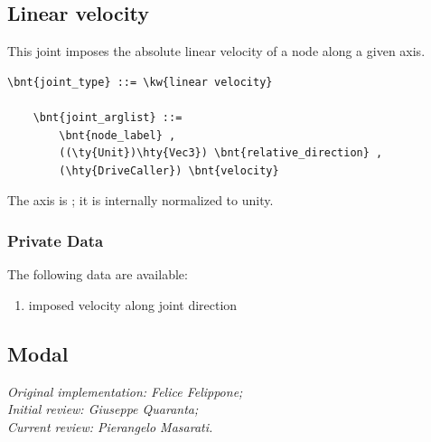 \subsection{Linear velocity}
This joint imposes the absolute linear velocity of a node
along a given axis.
\begin{Verbatim}[commandchars=\\\{\}]
    \bnt{joint_type} ::= \kw{linear velocity}

    \bnt{joint_arglist} ::=
        \bnt{node_label} ,
        ((\ty{Unit})\hty{Vec3}) \bnt{relative_direction} , 
        (\hty{DriveCaller}) \bnt{velocity}
\end{Verbatim}
The axis is ; it is internally normalized to unity.

\subsubsection{Private Data}
The following data are available:
\begin{enumerate}
\item {} imposed velocity along joint direction
\end{enumerate}



\subsection{Modal}\label{sec:EL:STRUCT:JOINT:MODAL}
\emph{
Original implementation: Felice Felippone; \\
Initial review: Giuseppe Quaranta; \\
Current review: Pierangelo Masarati.}

